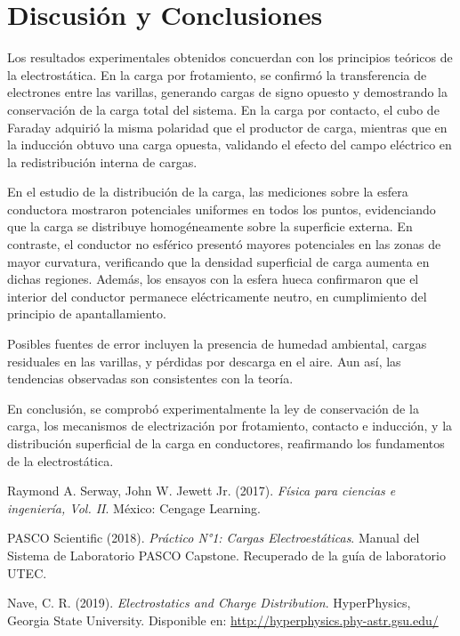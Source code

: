 \documentclass[12pt,a4paper]{article}
\begin{document}
\section{Discusión y Conclusiones}
Los resultados experimentales obtenidos concuerdan con los principios teóricos de la electrostática. En la carga por frotamiento, se confirmó la transferencia de electrones entre las varillas, generando cargas de signo opuesto y demostrando la conservación de la carga total del sistema. En la carga por contacto, el cubo de Faraday adquirió la misma polaridad que el productor de carga, mientras que en la inducción obtuvo una carga opuesta, validando el efecto del campo eléctrico en la redistribución interna de cargas.

En el estudio de la distribución de la carga, las mediciones sobre la esfera conductora mostraron potenciales uniformes en todos los puntos, evidenciando que la carga se distribuye homogéneamente sobre la superficie externa. En contraste, el conductor no esférico presentó mayores potenciales en las zonas de mayor curvatura, verificando que la densidad superficial de carga aumenta en dichas regiones. Además, los ensayos con la esfera hueca confirmaron que el interior del conductor permanece eléctricamente neutro, en cumplimiento del principio de apantallamiento.

Posibles fuentes de error incluyen la presencia de humedad ambiental, cargas residuales en las varillas, y pérdidas por descarga en el aire. Aun así, las tendencias observadas son consistentes con la teoría.

En conclusión, se comprobó experimentalmente la ley de conservación de la carga, los mecanismos de electrización por frotamiento, contacto e inducción, y la distribución superficial de la carga en conductores, reafirmando los fundamentos de la electrostática.


\begin{thebibliography}{9}

Raymond A. Serway, John W. Jewett Jr. (2017). \textit{Física para ciencias e ingeniería, Vol. II}. México: Cengage Learning.

PASCO Scientific (2018). \textit{Práctico N°1: Cargas Electroestáticas}. Manual del Sistema de Laboratorio PASCO Capstone. Recuperado de la guía de laboratorio UTEC.

Nave, C. R. (2019). \textit{Electrostatics and Charge Distribution}. HyperPhysics, Georgia State University. Disponible en: \url{http://hyperphysics.phy-astr.gsu.edu/}


\end{thebibliography}
\end{document}
